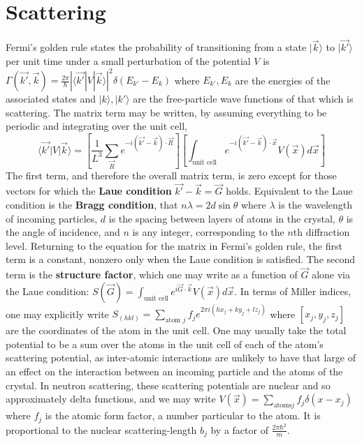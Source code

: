 \documentclass[10pt]{article}
\begin{document}
\section*{Scattering}
Fermi's golden rule states the probability of transitioning from a state $|\vec{k}\rangle$ to $|\vec{k'}\rangle$ per unit time
under a small perturbation of the potential $V$ is
$\Gamma(\vec{k'},\vec{k})=\frac{2\pi}{\hbar}|\langle \vec{k'}|V|\vec{k} \rangle|^{2}\delta(E_{k'}-E_{k})$ where $E_{k'},E_{k}$
are the energies of the associated states and $|k\rangle,|k'\rangle$ are the free-particle wave functions of that which is scattering.
The matrix term may be written, by assuming everything to be periodic and integrating over the unit cell,
\[
  \langle \vec{k'}|V|\vec{k}\rangle=\left[ \frac{1}{L^{3}}\sum_{\vec{R}}e^{-i(\vec{k'}-\vec{k})\cdot\vec{R}} \right]
  \left[ \int_{\textrm{unit cell}}e^{-i(\vec{k'}-\vec{k})\cdot \vec{x}}V(\vec{x})d\vec{x} \right]
\]
The first term, and therefore the overall matrix term, is zero except for those vectors for which the \textbf{Laue condition}
$\vec{k'}-\vec{k}=\vec{G}$ holds.
Equivalent to the Laue condition is the \textbf{Bragg condition}, that $n\lambda = 2d\sin\theta$ where $\lambda$ is the wavelength
of incoming particles, $d$ is the spacing between layers of atoms in the crystal, $\theta$ is the angle of incidence,
and $n$ is any integer, corresponding to the $n$th diffraction level.
Returning to the equation for the matrix in Fermi's golden rule, the first term is a constant, nonzero only when the Laue condition
is satisfied. The second term is the \textbf{structure factor}, which one may write as a function of $\vec{G}$ alone via the Laue
condition: $S(\vec{G})=\int_{\textrm{unit cell}}e^{i\vec{G}\cdot\vec{k}}V(\vec{x})d\vec{x}$.
In terms of Miller indices, one may explicitly write $S_{(hkl)}=\sum_{\textrm{atom }j}f_{j}e^{2\pi i(hx_{j}+ky_{j}+lz_{j})}$ where
$[x_{j},y_{j},z_{j}]$ are the coordinates of the atom in the unit cell.
One may usually take the total potential to be a sum over the atoms in the unit cell of each of the atom's scattering potential,
as inter-atomic interactions are unlikely to have that large of an effect on the interaction between an incoming particle
and the atoms of the crystal.
In neutron scattering, these scattering potentials are nuclear and so approximately delta functions, and we may write
$V(\vec{x})=\sum_{\textrm{atoms} j}f_{j}\delta(x-x_{j})$ where $f_{j}$ is the atomic form factor, a number particular to the atom.
It is proportional to the nuclear scattering-length $b_{j}$ by a factor of $\frac{2\pi\hbar^{2}}{m}$.
\end{document}
